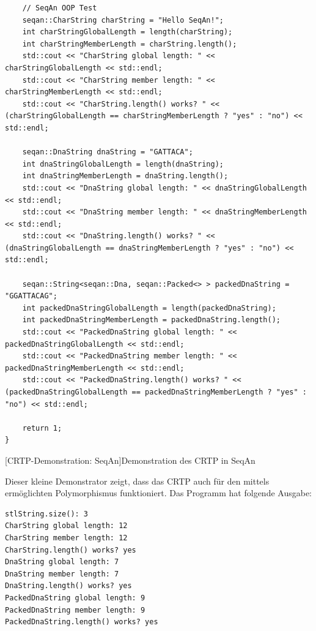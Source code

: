 \begin{itemize}
\begin{center}
\begin{verbatim}
    // SeqAn OOP Test
    seqan::CharString charString = "Hello SeqAn!";
    int charStringGlobalLength = length(charString);
    int charStringMemberLength = charString.length();
    std::cout << "CharString global length: " << charStringGlobalLength << std::endl;
    std::cout << "CharString member length: " << charStringMemberLength << std::endl;
    std::cout << "CharString.length() works? " << (charStringGlobalLength == charStringMemberLength ? "yes" : "no") << std::endl;
    
    seqan::DnaString dnaString = "GATTACA";
    int dnaStringGlobalLength = length(dnaString);
    int dnaStringMemberLength = dnaString.length();
    std::cout << "DnaString global length: " << dnaStringGlobalLength << std::endl;
    std::cout << "DnaString member length: " << dnaStringMemberLength << std::endl;
    std::cout << "DnaString.length() works? " << (dnaStringGlobalLength == dnaStringMemberLength ? "yes" : "no") << std::endl;
    
    seqan::String<seqan::Dna, seqan::Packed<> > packedDnaString = "GGATTACAG";
    int packedDnaStringGlobalLength = length(packedDnaString);
    int packedDnaStringMemberLength = packedDnaString.length();
    std::cout << "PackedDnaString global length: " << packedDnaStringGlobalLength << std::endl;
    std::cout << "PackedDnaString member length: " << packedDnaStringMemberLength << std::endl;
    std::cout << "PackedDnaString.length() works? " << (packedDnaStringGlobalLength == packedDnaStringMemberLength ? "yes" : "no") << std::endl;
    
    return 1;
}
\end{verbatim}
[CRTP-Demonstration: SeqAn]{Demonstration des CRTP in SeqAn}
\label{lst:crtp-seqan}
\end{center}
\end{itemize}



\bigskip

Dieser kleine Demonstrator zeigt, dass das CRTP auch für den mittels  ermöglichten Polymorphismus funktioniert. Das Programm hat folgende Ausgabe:
\begin{verbatim}
stlString.size(): 3
CharString global length: 12
CharString member length: 12
CharString.length() works? yes
DnaString global length: 7
DnaString member length: 7
DnaString.length() works? yes
PackedDnaString global length: 9
PackedDnaString member length: 9
PackedDnaString.length() works? yes
\end{verbatim}

